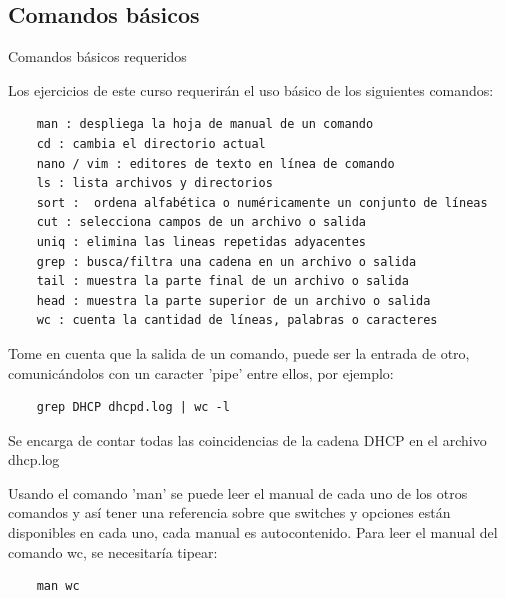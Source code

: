 \subsection{Comandos básicos} %

\begin{frame}{Comandos básicos requeridos} 

    Los ejercicios de este curso requerirán el uso básico de los siguientes
    comandos:

    \begin{verbatim}
    man : despliega la hoja de manual de un comando
    cd : cambia el directorio actual
    nano / vim : editores de texto en línea de comando
    ls : lista archivos y directorios
    sort :  ordena alfabética o numéricamente un conjunto de líneas
    cut : selecciona campos de un archivo o salida
    uniq : elimina las lineas repetidas adyacentes
    grep : busca/filtra una cadena en un archivo o salida
    tail : muestra la parte final de un archivo o salida
    head : muestra la parte superior de un archivo o salida
    wc : cuenta la cantidad de líneas, palabras o caracteres
    \end{verbatim}

    \framebreak

    Tome en cuenta que la salida de un comando, puede ser la entrada de otro,
    comunicándolos con un caracter 'pipe' entre ellos, por ejemplo:

    \begin{verbatim}
    grep DHCP dhcpd.log | wc -l
    \end{verbatim}

    Se encarga de contar todas las coincidencias de la cadena DHCP en el
    archivo dhcp.log

    Usando el comando 'man' se puede leer el manual de cada uno de los otros
    comandos y así tener una referencia sobre que switches y opciones están
    disponibles en cada uno, cada manual es autocontenido. Para leer el manual
    del comando wc, se necesitaría tipear:

    \begin{verbatim}
    man wc
    \end{verbatim} 

\end{frame}

